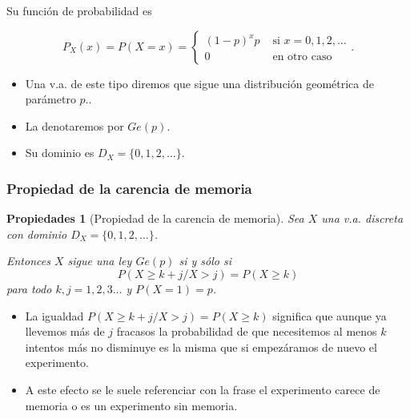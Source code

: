 \documentclass[handout]{beamer}
\renewcommand{\emph}[1]{{\color{red}#1}}
\renewcommand{\geq}{\geqslant}
\theoremstyle{plain}
\newtheorem{prop}{Propiedades}
\theoremstyle{definition}
\begin{document}
\begin{frame}
Su función de probabilidad es 

$$P_X(x)=P(X=x)=\left\{\begin{array}{ll}
 (1-p)^{x} p & \mbox{ si } x=0,1,2,\ldots\\
 0 &\mbox{ en otro caso}
    \end{array}\right..$$
\begin{itemize}
\item   Una v.a. de este tipo diremos que sigue una
    distribución geométrica de parámetro $p$..
\item La  denotaremos por $Ge(p)$. 
\item Su dominio es  $D_X=\{0,1,2,\ldots\}$.
\end{itemize}
\end{frame}

\begin{frame}
\subsubsection{Propiedad de la carencia de memoria}
\begin{prop}[Propiedad de la carencia de memoria]
Sea $X$ una v.a. discreta con dominio $D_X=\{0,1,2,\ldots\}$.

Entonces $X$ sigue una ley $Ge(p)$ si y sólo si  
$$P(X\geq k+j/X> j)=P(X\geq k)$$
para todo $k,j=1,2,3\ldots$ y $P(X=1)=p$.
\end{prop}
\end{frame}

\begin{frame}

\begin{itemize}
\item  La igualdad $P(X\geq k+j/X> j)=P(X\geq k)$   significa que aunque ya llevemos más de $j$ fracasos la probabilidad de que necesitemos al menos $k$ intentos más no disminuye es la misma  que si empezáramos de nuevo el experimento. 
\item A este efecto se le suele referenciar con la frase   \emph{el experimento carece de memoria} o es un \emph{experimento sin memoria}.
\end{itemize}
\end{frame}
\end{document}
